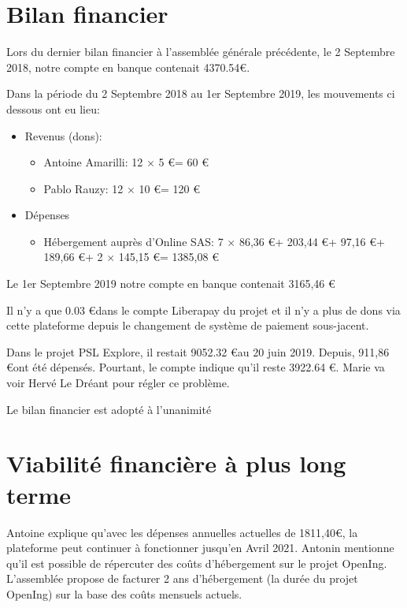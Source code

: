 \documentclass[a4paper]{article}
\begin{document}
\section{Bilan financier}

Lors du dernier bilan financier à l'assemblée générale précédente, le 2 Septembre 2018, notre compte en banque contenait 4370.54\euro.

Dans la période du 2 Septembre 2018 au 1er Septembre 2019, les mouvements ci dessous ont eu lieu:

\begin{itemize}
  \item Revenus (dons):
    \begin{itemize}
      \item Antoine Amarilli: 12 $\times$ 5 \euro = 60 \euro
      \item Pablo Rauzy: 12 $\times$ 10 \euro = 120 \euro
    \end{itemize}
   \item Dépenses
     \begin{itemize}
       \item Hébergement auprès d'Online SAS:  7 $\times$ 86,36 \euro + 203,44 \euro + 97,16 \euro + 189,66 \euro + 2 $\times$ 145,15 \euro = 1385,08 \euro
     \end{itemize}
\end{itemize}
    
Le 1er Septembre 2019 notre compte en banque contenait 3165,46 \euro

Il n'y a que 0.03 \euro dans le compte Liberapay du projet et il n'y a plus de dons
via cette plateforme depuis le changement de système de paiement sous-jacent.

Dans le projet PSL Explore, il restait 9052.32 \euro au 20 juin 2019. Depuis, 911,86 \euro ont été dépensés. Pourtant, le compte indique qu'il reste 3922.64 \euro. Marie va voir Hervé Le Dréant pour régler ce problème.

Le bilan financier est adopté à l'unanimité

\section{Viabilité financière à plus long terme}

Antoine explique qu'avec les dépenses annuelles actuelles de 1811,40\euro, la plateforme peut continuer à fonctionner jusqu'en Avril 2021.
Antonin mentionne qu'il est possible de répercuter des coûts d'hébergement sur le projet OpenIng. L'assemblée propose de facturer 2 ans d'hébergement (la durée du projet OpenIng) sur la base des coûts mensuels actuels.
\end{document}
